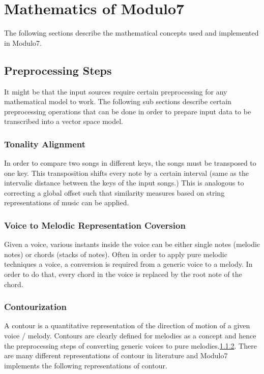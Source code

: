 \chapter{Mathematics of Modulo7}
\label{sec:mir math}

\noindent The following sections describe the mathematical concepts used and implemented in Modulo7.

\section{Preprocessing Steps} \label{sim:preprocess}

\noindent It might be that the input sources require certain preprocessing for any mathematical model to work. The following sub sections describe certain preprocessing operations that can be done in order to prepare input data to be transcribed into a vector space model. 

\subsection{Tonality Alignment} \label{tonalityalignment}

\noindent In order to compare two songs in different keys, the songs must be transposed to one key. This transposition shifts every note by a certain interval (same as the intervalic distance between the keys of the input songs.) This is analogous to correcting a global offset such that similarity measures based on string representations of music can be applied.

\subsection{Voice to Melodic Representation Coversion} \label{voicemelconv} 

\noindent Given a voice, various instants inside the voice can be either single notes (melodic notes) or chords (stacks of notes). Often in order to apply pure melodic techniques a voice, a conversion is required from a generic voice to a melody. In order to do that, every chord in the voice is replaced by the root note of the chord. 

\subsection{Contourization} \label{contourization}

\noindent A contour is a quantitative representation of the direction of motion of a given voice / melody. Contours are clearly defined for melodies as a concept and hence the preprocessing steps of converting generic voices to pure melodies.\ref{voicemelconv}. There are many different representations of contour in literature and Modulo7 implements the following representations of contour. \\

